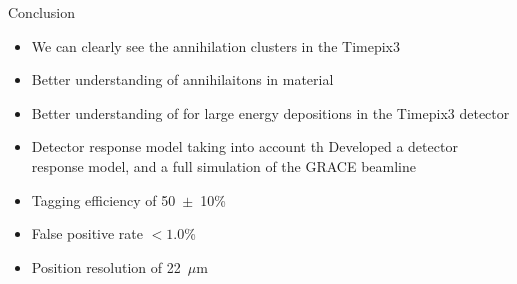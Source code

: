 \documentclass{beamer}
\begin{document}
\begin{frame}{Conclusion}
  \begin{itemize}
  \item{We can clearly see the annihilation clusters in the Timepix3}
  \item{Better understanding of annihilaitons in material}
   \item{Better understanding of for large energy depositions in the Timepix3 detector}
   \item{Detector response model taking into account th
     Developed a detector response model, and a full simulation of the GRACE beamline}
  \item{Tagging efficiency of 50~$\pm$~10\%}
  \item{False positive rate $< 1.0$\%}
  \item{Position resolution of 22~$\mu$m}
  \end{itemize}
\end{frame}
  
\end{document}
